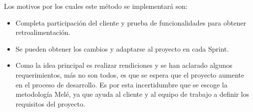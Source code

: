 Los motivos por los cuales este método se implementará son:

\begin{itemize}
	\item Completa participación del cliente y prueba de funcionalidades para obtener retroalimentación.

	\item Se pueden obtener los cambios y adaptarse al proyecto en cada Sprint.

	\item Como la idea principal es realizar rendiciones y se han aclarado algunos requerimientos, más no son todos, es que se espera que el proyecto aumente en el proceso de desarrollo. Es por esta incertidumbre que se escoge la metodología Melé, ya que ayuda al cliente y al equipo de trabajo a definir los requisitos del proyecto.
\end{itemize}


